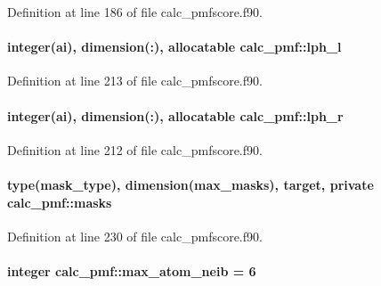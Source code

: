 Definition at line 186 of file calc\-\_\-pmfscore.\-f90.

\hypertarget{classcalc__pmf_a46e29646f71e1615ceac97effe79bf6a}{
\paragraph[{lph\-\_\-l}]{\setlength{\rightskip}{0pt plus 5cm}integer(ai), dimension(\-:), allocatable calc\-\_\-pmf\-::lph\-\_\-l}}\label{classcalc__pmf_a46e29646f71e1615ceac97effe79bf6a}


Definition at line 213 of file calc\-\_\-pmfscore.\-f90.

\hypertarget{classcalc__pmf_a3fef19c1e6b623231279e839e8d3488f}{
\paragraph[{lph\-\_\-r}]{\setlength{\rightskip}{0pt plus 5cm}integer(ai), dimension(\-:), allocatable calc\-\_\-pmf\-::lph\-\_\-r}}\label{classcalc__pmf_a3fef19c1e6b623231279e839e8d3488f}


Definition at line 212 of file calc\-\_\-pmfscore.\-f90.

\hypertarget{classcalc__pmf_a8aca40bc9c2879edfb104445cf45db0b}{
\paragraph[{masks}]{\setlength{\rightskip}{0pt plus 5cm}type(mask\-\_\-type), dimension({\bf max\-\_\-masks}), target, private calc\-\_\-pmf\-::masks\hspace{0.3cm}{\ttfamily [private]}}}\label{classcalc__pmf_a8aca40bc9c2879edfb104445cf45db0b}


Definition at line 230 of file calc\-\_\-pmfscore.\-f90.

\hypertarget{classcalc__pmf_a2a1e733c9f112f18e86ac8654f47f873}{
\paragraph[{max\-\_\-atom\-\_\-neib}]{\setlength{\rightskip}{0pt plus 5cm}integer calc\-\_\-pmf\-::max\-\_\-atom\-\_\-neib = 6}}\label{classcalc__pmf_a2a1e733c9f112f18e86ac8654f47f873}


